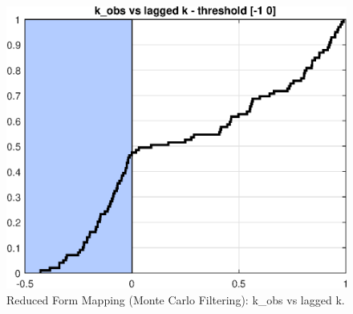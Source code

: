 
\begin{figure}[H]
\centering 
\includegraphics[width=1.00\textwidth]{RBC_kz/gsa/redform_prior/k_obs_vs_k_threshold/RBC_kz_prior_k_obs_vs_k}
\caption{Reduced Form Mapping (Monte Carlo Filtering): k\_obs vs lagged k.}\label{Fig:prior_k_obs_vs_k}
\end{figure}

